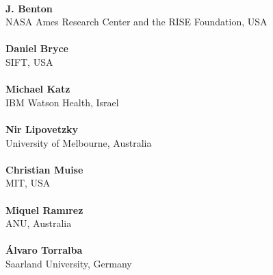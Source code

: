 {\Large
\ \\ 
{\bf J. Benton} \\ 
NASA Ames Research Center and the RISE Foundation, USA\\
\ \\
{\bf Daniel Bryce} \\
SIFT, USA\\
\ \\
{\bf Michael Katz} \\
IBM Watson Health, Israel\\
\ \\
{\bf Nir Lipovetzky} \\
University of Melbourne, Australia\\
\ \\
{\bf Christian Muise}\\
MIT, USA\\
\ \\
{\bf Miquel Ramırez}\\
ANU, Australia\\
\ \\
{\bf {\'A}lvaro Torralba}\\
Saarland University, Germany

}


